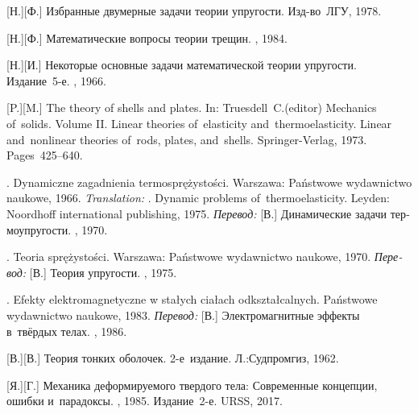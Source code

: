 \begin{thebibliography}{123}
\begin{otherlanguage}{russian}
[Н.][Ф.] Избранные двумерные задачи теории упругости. Изд\hbox{-}во~ЛГУ, 1978. 

[Н.][Ф.] Математические вопросы теории трещин. \naukapublisher, 1984. 

[Н.][И.] Некоторые основные задачи математической теории упругости. Издание~5\hbox{-}е. \naukapublisher, 1966. 

[P.][M.] The theory of shells and plates. In: Truesdell~C.\:(editor) Mechanics of~solids. Volume II. Linear theories of~elasticity and~thermoelasticity. Linear and~nonlinear theories of~rods, plates, and~shells. Springer\hbox{-}Verlag, 1973. Pages~425\hbox{--}640.

. Dynamiczne zagadnienia termosprężystości. Warsza\-wa: Państwowe wydawnictwo naukowe, 1966. 
\emph{Translation:}
. Dynamic problems of~thermoelasticity. Leyden: Noordhoff international publishing, 1975.
\emph{Перевод:}
[В.] Динамические задачи термоупругости. \mirpublisher, 1970. 

. Teoria sprężystości. Warszawa: Państwowe wy\-daw\-nic\-two naukowe, 1970. 
\emph{Перевод:}
[В.] Теория упругости. \mirpublisher, 1975. 

. Efekty elektromagnetyczne w stałych ciałach od\-kształ\-cal\-nych. Państwowe wydawnictwo naukowe, 1983. 
\emph{Перевод:}
[В.] Электромагнитные эффекты в~твёрдых телах. \mirpublisher, 1986. 

[В.][В.] Теория тонких оболочек. 2\hbox{-}е~издание. Л.:\;Судпромгиз, 1962. 

[Я.][Г.] Механика деформируемого твердого тела: Современные концепции, ошибки и~парадоксы. \naukapublisher, 1985. Издание~2\hbox{-}е. URSS, 2017. 


\end{otherlanguage}
\end{thebibliography}
